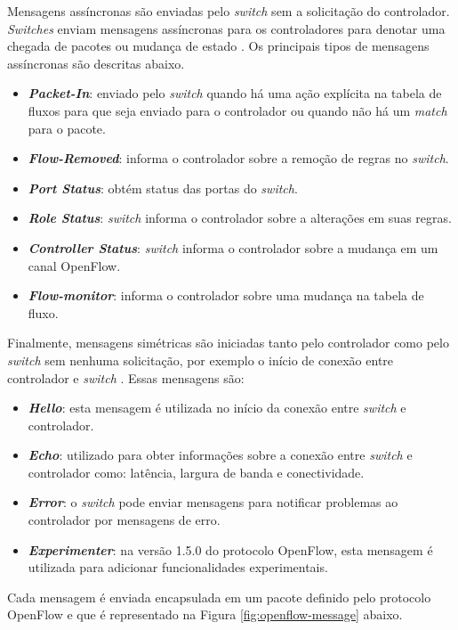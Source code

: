 Mensagens assíncronas são enviadas pelo \textit{switch} sem a solicitação do controlador. \textit{Switches} enviam mensagens assíncronas para os controladores para denotar uma chegada de pacotes ou mudança de estado \cite{OpenFlowSpec:2014}. Os principais tipos de mensagens assíncronas são descritas abaixo.
\begin{itemize}
    \item \textit{\textbf{Packet-In}}: enviado pelo \textit{switch} quando há uma ação explícita na tabela de fluxos para que seja enviado para o controlador ou quando não há um \textit{match} para o pacote.
    \item \textit{\textbf{Flow-Removed}}: informa o controlador sobre a remoção de regras no \textit{switch}.
    \item \textit{\textbf{Port Status}}: obtém status das portas do \textit{switch}.
    \item \textit{\textbf{Role Status}}: \textit{switch} informa o controlador sobre a alterações em suas regras.
    \item \textit{\textbf{Controller Status}}: \textit{switch} informa o controlador sobre a mudança em um canal OpenFlow.
    \item \textit{\textbf{Flow-monitor}}: informa o controlador sobre uma mudança na tabela de fluxo.
\end{itemize}

Finalmente, mensagens simétricas são iniciadas tanto pelo controlador como pelo \textit{switch} sem nenhuma solicitação, por exemplo o início de conexão entre controlador e \textit{switch} \cite{OpenFlowSpec:2014}. Essas mensagens são:
\begin{itemize}
    \item \textit{\textbf{Hello}}: esta mensagem é utilizada no início da conexão entre \textit{switch} e controlador.
    \item \textit{\textbf{Echo}}: utilizado para obter informações sobre a conexão entre \textit{switch} e controlador como:
latência, largura de banda e conectividade.
    \item \textit{\textbf{Error}}:  o \textit{switch} pode enviar mensagens para notificar problemas ao controlador por mensagens de erro.
    \item \textit{\textbf{Experimenter}}: na versão 1.5.0 do protocolo OpenFlow, esta mensagem é utilizada para adicionar funcionalidades experimentais.
\end{itemize}

Cada mensagem é enviada encapsulada em um pacote definido pelo protocolo OpenFlow e que é representado na Figura \ref{fig:openflow-message} abaixo.


